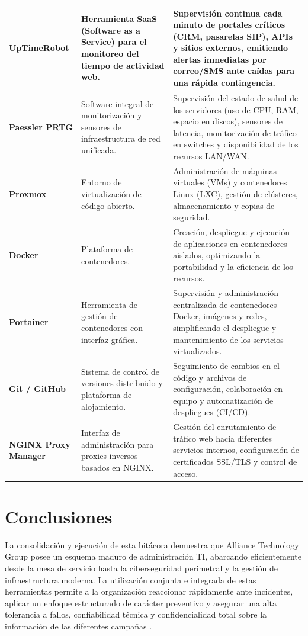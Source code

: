 \begin{tabularx}{\textwidth}{|p{3.5cm}|X|X|}
		\textbf{UpTimeRobot} & Herramienta SaaS (Software as a Service) para el monitoreo del tiempo de actividad web. & Supervisión continua cada minuto de portales críticos (CRM, pasarelas SIP), APIs y sitios externos, emitiendo alertas inmediatas por correo/SMS ante caídas para una rápida contingencia. \\ \hline
		\textbf{Paessler PRTG} & Software integral de monitorización y sensores de infraestructura de red unificada. & Supervisión del estado de salud de los servidores (uso de CPU, RAM, espacio en discos), sensores de latencia, monitorización de tráfico en switches y disponibilidad de los recursos LAN/WAN. \\ \hline
		\textbf{Proxmox} & Entorno de virtualización de código abierto. & Administración de máquinas virtuales (VMs) y contenedores Linux (LXC), gestión de clústeres, almacenamiento y copias de seguridad. \\ \hline
		\textbf{Docker} & Plataforma de contenedores. & Creación, despliegue y ejecución de aplicaciones en contenedores aislados, optimizando la portabilidad y la eficiencia de los recursos. \\ \hline
		\textbf{Portainer} & Herramienta de gestión de contenedores con interfaz gráfica. & Supervisión y administración centralizada de contenedores Docker, imágenes y redes, simplificando el despliegue y mantenimiento de los servicios virtualizados. \\ \hline
		\textbf{Git / GitHub} & Sistema de control de versiones distribuido y plataforma de alojamiento. & Seguimiento de cambios en el código y archivos de configuración, colaboración en equipo y automatización de despliegues (CI/CD). \\ \hline
		\textbf{NGINX Proxy Manager} & Interfaz de administración para proxies inversos basados en NGINX. & Gestión del enrutamiento de tráfico web hacia diferentes servicios internos, configuración de certificados SSL/TLS y control de acceso. \\ \hline
	\end{tabularx}
	\vspace{0.5cm}
	
	\section{Conclusiones}
	La consolidación y ejecución de esta bitácora demuestra que Alliance Technology Group posee un esquema maduro de administración TI, abarcando eficientemente desde la mesa de servicio hasta la ciberseguridad perimetral y la gestión de infraestructura moderna. La utilización conjunta e integrada de estas herramientas permite a la organización reaccionar rápidamente ante incidentes, aplicar un enfoque estructurado de carácter preventivo y asegurar una alta tolerancia a fallos, confiabilidad técnica y confidencialidad total sobre la información de las diferentes campañas \parencite{sena2026servidores}.
	
